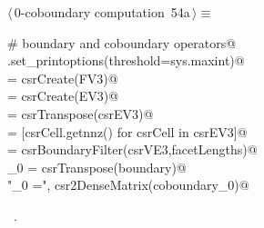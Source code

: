 \documentclass[11pt,oneside]{article}    %
\begin{document}
\begin{flushleft} \small \label{scrap93}
\protect{}$\langle\,$0-coboundary computation\nobreak\ {\footnotesize 54a}$\,\rangle\equiv$
\vspace{-1ex}
\begin{list}{}{} \item
\mbox{}\verb@# boundary and coboundary operators@\\
\mbox{}\verb@np.set_printoptions(threshold=sys.maxint)@\\
\mbox{} = csrCreate(FV3)@\\
\mbox{} = csrCreate(EV3)@\\
\mbox{} = csrTranspose(csrEV3)@\\
\mbox{}\verb@facetLengths = [csrCell.getnnz() for csrCell in csrEV3]@\\
\mbox{}\verb@boundary = csrBoundaryFilter(csrVE3,facetLengths)@\\
\mbox{}\verb@coboundary_0 = csrTranspose(boundary)@\\
\mbox{}\verb@print "\ncoboundary_0 =\n", csr2DenseMatrix(coboundary_0)@\\
\mbox{}\verb@@{\NWsep}
\end{list}
\vspace{-1ex}
\footnotesize\addtolength{\baselineskip}{-1ex}
\begin{list}{}{\setlength{\itemsep}{-\parsep}\setlength{\itemindent}{-\leftmargin}}
\item \NWtxtMacroRefIn\ .
\end{list}
\end{flushleft}
\end{document}
